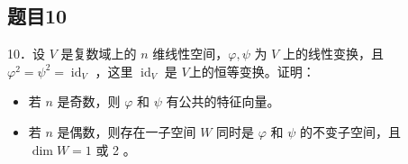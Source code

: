 \documentclass{article}
\begin{document}
\subsection{题目10}
10．设 \(V\) 是复数域上的 \(n\) 维线性空间，\(\varphi, \psi\) 为 \(V\) 上的线性变换，且 \(\varphi^{2}=\psi^{2}=\operatorname{id}_{V}\) ，这里 \(\operatorname{id}_{V}\) 是 \(V\)上的恒等变换。证明：

\begin{itemize}
  \item[（1）] 若 \(n\) 是奇数，则 \(\varphi\) 和 \(\psi\) 有公共的特征向量。
  \item[（2）] 若 \(n\) 是偶数，则存在一子空间 \(W\) 同时是 \(\varphi\) 和 \(\psi\) 的不变子空间，且 \(\operatorname{dim} W=1\) 或 2 。
\end{itemize}
\end{document}
